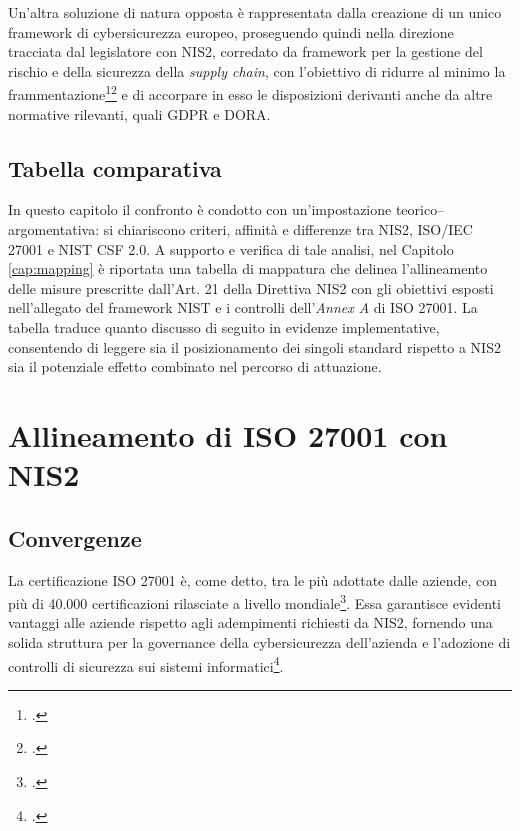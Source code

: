 Un'altra soluzione di natura opposta è rappresentata dalla creazione di un unico framework di cybersicurezza 
europeo, proseguendo quindi nella direzione tracciata dal legislatore con NIS2, corredato da
framework per la gestione del rischio e della sicurezza della \textit{supply chain}, con l'obiettivo di
ridurre al minimo la frammentazione\footcite[pp. 4--6]{parmar-miles-csf}\footcite[pp. 7--9]{ecso-whitepaper-nis2}
e di accorpare in esso le disposizioni derivanti anche da altre normative rilevanti, quali GDPR e DORA.


\subsection{Tabella comparativa}
In questo capitolo il confronto è condotto con un’impostazione teorico–argomentativa: si chiariscono criteri, affinità e differenze tra NIS2, 
ISO/IEC 27001 e NIST CSF 2.0. A supporto e verifica di tale analisi, nel Capitolo \ref{cap:mapping} è riportata una tabella di mappatura che 
delinea l'allineamento delle misure prescritte dall'Art. 21 della Direttiva NIS2 con gli obiettivi esposti nell'allegato del framework NIST
e i controlli dell'\textit{Annex A} di ISO 27001.
La tabella traduce quanto discusso di seguito in evidenze implementative, consentendo di leggere sia il posizionamento dei singoli standard 
rispetto a NIS2 sia il potenziale effetto combinato nel percorso di attuazione.



\section{Allineamento di ISO 27001 con NIS2}

\subsection{Convergenze}
La certificazione ISO 27001 è, come detto, tra le più adottate dalle aziende, con più di 40.000 certificazioni rilasciate a livello 
mondiale\footcite[p. 2]{mcintosh}. Essa garantisce evidenti vantaggi alle aziende rispetto agli 
adempimenti richiesti da NIS2, fornendo una solida struttura per la governance della cybersicurezza dell'azienda e l'adozione di 
controlli di sicurezza sui sistemi informatici\footcite[p. 35]{ecso-whitepaper-nis2}.

